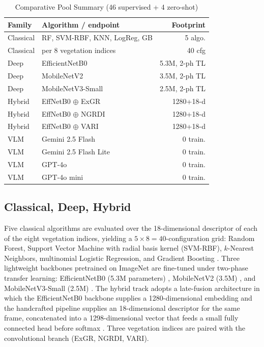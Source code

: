 \documentclass[conference]{IEEEtran}
\begin{document}
\begin{table}[t]
\caption{Comparative Pool Summary (46 supervised + 4 zero-shot)}
\label{tab:pool}
\centering
\scriptsize
\setlength{\tabcolsep}{3pt}
\begin{tabular}{@{}l l r@{}}
\toprule
Family & Algorithm / endpoint & Footprint \\
\midrule
Classical & RF, SVM-RBF, KNN, LogReg, GB & 5 algo. \\
Classical & per 8 vegetation indices     & 40 cfg \\
Deep      & EfficientNetB0               & 5.3M, 2-ph TL \\
Deep      & MobileNetV2                  & 3.5M, 2-ph TL \\
Deep      & MobileNetV3-Small            & 2.5M, 2-ph TL \\
Hybrid    & EffNetB0 $\oplus$ ExGR       & 1280+18-d \\
Hybrid    & EffNetB0 $\oplus$ NGRDI      & 1280+18-d \\
Hybrid    & EffNetB0 $\oplus$ VARI       & 1280+18-d \\
VLM       & Gemini 2.5 Flash             & 0 train. \\
VLM       & Gemini 2.5 Flash Lite        & 0 train. \\
VLM       & GPT-4o                       & 0 train. \\
VLM       & GPT-4o mini                  & 0 train. \\
\bottomrule
\end{tabular}
\end{table}

\subsection{Classical, Deep, Hybrid}
Five classical algorithms are evaluated over the 18-dimensional descriptor of each of the eight vegetation indices, yielding a $5\times 8 = 40$-configuration grid: Random Forest, Support Vector Machine with radial basis kernel (SVM-RBF), $k$-Nearest Neighbors, multinomial Logistic Regression, and Gradient Boosting \cite{b_benos,b_suryono}. Three lightweight backbones pretrained on ImageNet are fine-tuned under two-phase transfer learning: EfficientNetB0 (5.3M parameters) \cite{b_efficientnet}, MobileNetV2 (3.5M) \cite{b_mobilenetv2}, and MobileNetV3-Small (2.5M) \cite{b_mobilenetv3}. The hybrid track adopts a late-fusion architecture in which the EfficientNetB0 backbone supplies a 1280-dimensional embedding and the handcrafted pipeline supplies an 18-dimensional descriptor for the same frame, concatenated into a 1298-dimensional vector that feeds a small fully connected head before softmax \cite{b_yang}. Three vegetation indices are paired with the convolutional branch (ExGR, NGRDI, VARI).
\end{document}
